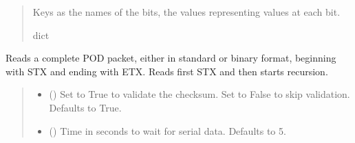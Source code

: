 \documentclass[letterpaper,10pt,english]{sphinxmanual}
\begin{document}
\begin{fulllineitems}
\begin{fulllineitems}
\begin{quote}
\begin{description}
\sphinxAtStartPar
Keys as the names of the bits, the values representing values at each bit.

\sphinxAtStartPar
dict

\end{description}\end{quote}

\end{fulllineitems}


\begin{fulllineitems}
\label{\detokenize{PodApi.Devices:PodApi.Devices.PodDevice_8480SC.Pod8480SC.ReadPODpacket}}
\pysigstartsignatures
{}
\pysigstopsignatures
\sphinxAtStartPar
Reads a complete POD packet, either in standard or binary format, beginning with STX and         ending with ETX. Reads first STX and then starts recursion.
\begin{quote}\begin{description}
\begin{itemize}
\item {} 
\sphinxAtStartPar
{} (\sphinxstyleliteralemphasis{\sphinxupquote{, }}) \textendash{} Set to True to validate the checksum. Set to False to                 skip validation. Defaults to True.

\item {} 
\sphinxAtStartPar
{} (\sphinxstyleliteralemphasis{\sphinxupquote{|}}\sphinxstyleliteralemphasis{\sphinxupquote{, }}) \textendash{} Time in seconds to wait for serial data.                 Defaults to 5.


\end{itemize}
\end{description}
\end{quote}
\end{fulllineitems}
\end{fulllineitems}
\end{document}
